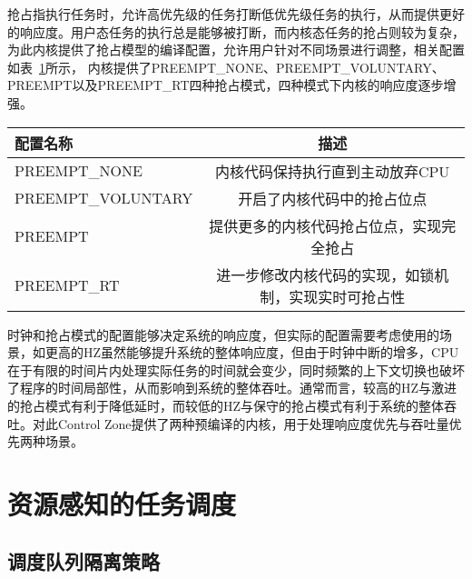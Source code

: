 抢占指执行任务时，允许高优先级的任务打断低优先级任务的执行，从而提供更好的响应度。用户态任务的执行总是能够被打断，而内核态任务的抢占则较为复杂，为此内核提供了抢占模型的编译配置，允许用户针对不同场景进行调整，相关配置如表~\ref{tab:config_preempt}所示， 内核提供了PREEMPT\_NONE、PREEMPT\_VOLUNTARY、PREEMPT以及PREEMPT\_RT四种抢占模式，四种模式下内核的响应度逐步增强。

\begin{table}
    \label{tab:config_preempt}
    \footnotesize%
    \setlength{\tabcolsep}{4pt}%
    \renewcommand{\arraystretch}{1.5}%
    \centering
    \begin{tabular}{lc}
        \hline
        配置名称 & 描述 \\
        \hline
        PREEMPT\_NONE  & 内核代码保持执行直到主动放弃CPU  \\
        PREEMPT\_VOLUNTARY  & 开启了内核代码中的抢占位点 \\
        PREEMPT  & 提供更多的内核代码抢占位点，实现完全抢占 \\
        PREEMPT\_RT & 进一步修改内核代码的实现，如锁机制，实现实时可抢占性 \\
        \hline
    \end{tabular}
\end{table}

时钟和抢占模式的配置能够决定系统的响应度，但实际的配置需要考虑使用的场景，如更高的HZ虽然能够提升系统的整体响应度，但由于时钟中断的增多，CPU在于有限的时间片内处理实际任务的时间就会变少，同时频繁的上下文切换也破坏了程序的时间局部性，从而影响到系统的整体吞吐。通常而言，较高的HZ与激进的抢占模式有利于降低延时，而较低的HZ与保守的抢占模式有利于系统的整体吞吐。对此Control Zone提供了两种预编译的内核，用于处理响应度优先与吞吐量优先两种场景。

\section{资源感知的任务调度}


\subsection{调度队列隔离策略}

